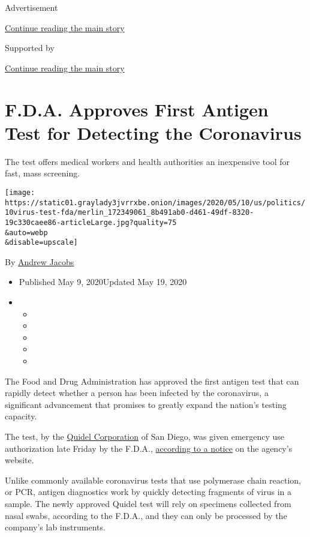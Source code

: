 Advertisement

\protect\hyperlink{after-top}{Continue reading the main story}

Supported by

\protect\hyperlink{after-sponsor}{Continue reading the main story}

\hypertarget{fda-approves-first-antigen-test-for-detecting-the-coronavirus}{%
\section{F.D.A. Approves First Antigen Test for Detecting the
Coronavirus}\label{fda-approves-first-antigen-test-for-detecting-the-coronavirus}}

The test offers medical workers and health authorities an inexpensive
tool for fast, mass screening.

\texttt{[image: https://static01.graylady3jvrrxbe.onion/images/2020/05/10/us/politics/10virus-test-fda/merlin\_172349061\_8b491ab0-d461-49df-8320-19c330caee86-articleLarge.jpg?quality=75\\\&auto=webp\\\&disable=upscale]}

By \href{https://www.nytimes3xbfgragh.onion/by/andrew-jacobs}{Andrew
Jacobs}

\begin{itemize}
\item
  Published May 9, 2020Updated May 19, 2020
\item
  \begin{itemize}
  \item
  \item
  \item
  \item
  \item
  \end{itemize}
\end{itemize}

The Food and Drug Administration has approved the first antigen test
that can rapidly detect whether a person has been infected by the
coronavirus, a significant advancement that promises to greatly expand
the nation's testing capacity.

The test, by the
\href{https://ir.quidel.com/news/news-release-details/2020/Quidel-Receives-Emergency-Authorization-for-Rapid-Antigen-COVID-19-Diagnostic-Assay/default.aspx}{Quidel
Corporation} of San Diego, was given emergency use authorization late
Friday by the F.D.A.,
\href{https://www.fda.gov/media/137886/download}{according to a notice}
on the agency's website.

Unlike commonly available coronavirus tests that use polymerase chain
reaction, or PCR, antigen diagnostics work by quickly detecting
fragments of virus in a sample. The newly approved Quidel test will rely
on specimens collected from nasal swabs, according to the F.D.A., and
they can only be processed by the company's lab instruments.

